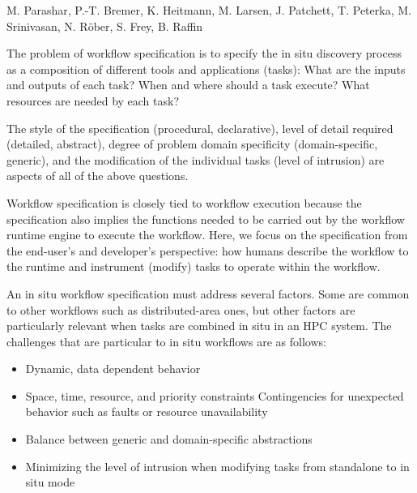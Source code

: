 \license

 M. Parashar, P.-T. Bremer, K. Heitmann, M. Larsen, J. Patchett, T. Peterka, M. Srinivasan, N. Röber, S. Frey, B. Raffin

\begin{refsection}

The problem of workflow specification is to specify the in situ discovery process as a composition of different tools and applications (tasks): What are the inputs and outputs of each task? When and where should a task execute? What resources are needed by each task?

The style of the specification (procedural, declarative), level of detail required (detailed, abstract),  degree of problem domain specificity (domain-specific, generic), and the modification of the individual tasks (level of intrusion) are aspects of all of the above questions.

Workflow specification is closely tied to workflow execution because the specification also implies the functions needed to be carried out by the workflow runtime engine to execute the workflow. Here, we focus on the specification from the end-user’s and developer’s perspective: how humans describe the workflow to the runtime and instrument (modify) tasks to operate within the workflow.

An in situ workflow specification must address several factors. Some are common to other workflows such as distributed-area ones, but other factors are particularly relevant when tasks are combined in situ in an HPC system. The challenges that are particular to in situ workflows are as follows:

\begin{itemize}
\item Dynamic, data dependent behavior
\item Space, time, resource, and priority constraints
Contingencies for unexpected behavior such as faults or resource unavailability
\item Balance between generic and domain-specific abstractions
\item Minimizing the level of intrusion when modifying tasks from standalone to in situ mode
\end{itemize}


\end{refsection}
